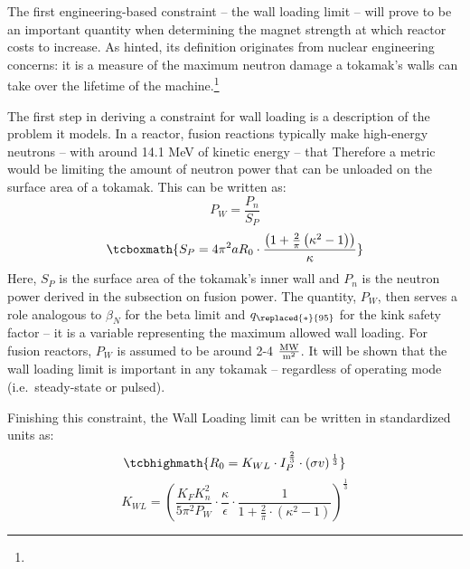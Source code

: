 The first engineering-based  constraint -- the wall loading limit -- will prove to be an important quantity when determining the magnet strength at which reactor costs  to increase. As hinted, its definition originates from nuclear engineering concerns: it is a measure of the maximum neutron damage a tokamak's walls can take over the lifetime of the machine.\footnote{}

The first step in deriving a  constraint for wall loading is a description of the problem it models. In a reactor, fusion reactions typically make high-energy neutrons -- with around 14.1 MeV of kinetic energy -- that  Therefore a  metric would be limiting the amount of neutron power that can be unloaded on the surface area of a tokamak. This can be written as:\cite{minervini}
\begin{equation}
	P_W = \frac{ P_n }{ S_P }
\end{equation}
\begin{equation}
	\tcboxmath{
	S_P = 4 \pi^2 a R_0 \cdot \frac{ \left( 1 + \frac{2}{\pi} \left( \kappa^2 -1 \right) \right) }{ \kappa }
	}
\end{equation}
Here, $S_P$ is the surface area of the tokamak's inner wall and $P_n$ is the neutron power derived in the subsection on fusion power. The quantity, $P_W$, then serves a role analogous to $\beta_N$ for the beta limit and $q_{\replaced{*}{95}}$ for the kink safety factor -- it is a  variable representing the maximum allowed wall loading. For fusion reactors, $P_W$ is assumed to be around 2-4 $\frac{\textnormal{MW}}{\textnormal{m}^2}$. It will be shown that the wall loading limit is important in any tokamak -- regardless of operating mode (i.e.\ steady-state or pulsed).

Finishing this  constraint, the Wall Loading limit can be written in standardized units as:
\begin{equation}
	\label{eq:r_wall}
	\tcbhighmath{ R_0 = K_{WL} \cdot I_P^{ \, \frac{2}{3} } \cdot (\sigma v) ^{ \, \frac{1}{3} } }
\end{equation} 
\begin{equation}
	K_{WL} = \left( \frac{ K_F K_n^2 }{ 5 \pi^2 P_W } \cdot \frac{\kappa}{\epsilon} \cdot \frac{1}{1 + \frac{2}{\pi} \cdot ( \kappa^2 - 1 ) } \right) ^ { \frac{1}{3} }
\end{equation} 
